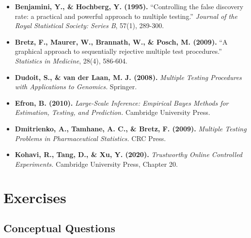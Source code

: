 \begin{itemize}
    \item \textbf{Benjamini, Y., \& Hochberg, Y. (1995).} ``Controlling the false discovery rate: a practical and powerful approach to multiple testing.'' \textit{Journal of the Royal Statistical Society: Series B}, 57(1), 289-300.

    \item \textbf{Bretz, F., Maurer, W., Brannath, W., \& Posch, M. (2009).} ``A graphical approach to sequentially rejective multiple test procedures.'' \textit{Statistics in Medicine}, 28(4), 586-604.

    \item \textbf{Dudoit, S., \& van der Laan, M. J. (2008).} \textit{Multiple Testing Procedures with Applications to Genomics.} Springer.

    \item \textbf{Efron, B. (2010).} \textit{Large-Scale Inference: Empirical Bayes Methods for Estimation, Testing, and Prediction.} Cambridge University Press.

    \item \textbf{Dmitrienko, A., Tamhane, A. C., \& Bretz, F. (2009).} \textit{Multiple Testing Problems in Pharmaceutical Statistics.} CRC Press.

    \item \textbf{Kohavi, R., Tang, D., \& Xu, Y. (2020).} \textit{Trustworthy Online Controlled Experiments.} Cambridge University Press, Chapter 20.
\end{itemize}

\section{Exercises}

\subsection{Conceptual Questions}

